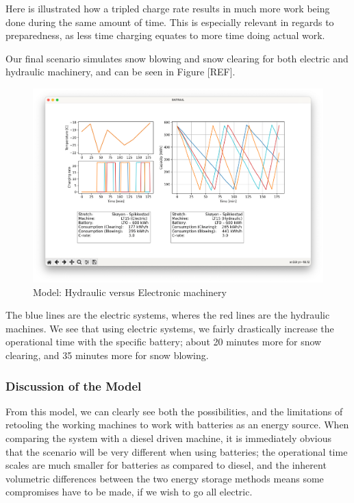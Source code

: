 \documentclass{article}
\begin{document}
Here is illustrated how a tripled charge rate results in much more work being done during the same amount of time. This is especially relevant in regards to preparedness, as less time charging equates to more time doing actual work.

Our final scenario simulates snow blowing and snow clearing for both electric and hydraulic machinery, and can be seen in Figure [REF].

\begin{figure}[H]
    \centering
    \includegraphics*[width=1\textwidth]{img/image10.png}
    \caption{Model: Hydraulic versus Electronic machinery}
\end{figure}

The blue lines are the electric systems, wheres the red lines are the hydraulic machines. We see that using electric systems, we fairly drastically increase the operational time with the specific battery; about 20 minutes more for snow clearing, and 35 minutes more for snow blowing. 


\subsubsection*{Discussion of the Model}

From this model, we can clearly see both the possibilities, and the limitations of retooling the working machines to work with batteries as an energy source. When comparing the system with a diesel driven machine, it is immediately obvious that the scenario will be very different when using batteries; the operational time scales are much smaller for batteries as compared to diesel, and the inherent volumetric differences between the two energy storage methods means some compromises have to be made, if we wish to go all electric.
\end{document}
